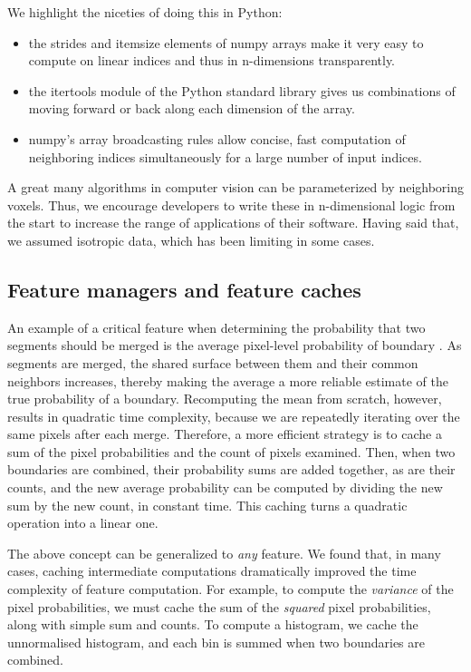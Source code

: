 \documentclass{frontiersSCNS} %
\begin{document}
We highlight the niceties of doing this in Python:
\begin{itemize}
\item the strides and itemsize elements of numpy arrays make it very easy to compute on linear indices and thus in n-dimensions transparently.
\item the itertools module of the Python standard library gives us combinations of moving forward or back along each dimension of the array.
\item numpy's array broadcasting rules allow concise, fast computation of neighboring indices simultaneously for a large number of input indices.
\end{itemize}

A great many algorithms in computer vision can be parameterized by neighboring voxels.
Thus, we encourage developers to write these in n-dimensional logic from the start to increase the range of applications of their software.
Having said that, we assumed isotropic data, which has been limiting in some cases.

\subsection{Feature managers and feature caches}
\label{sec:feature-man}

An example of a critical feature when determining the probability that two segments should be merged is the average pixel-level probability of boundary \citep{Ren:2003jg}.
As segments are merged, the shared surface between them and their common neighbors increases, thereby making the average a more reliable estimate of the true probability of a boundary.
Recomputing the mean from scratch, however, results in quadratic time complexity, because we are repeatedly iterating over the same pixels after each merge.
Therefore, a more efficient strategy is to cache a sum of the pixel probabilities and the count of pixels examined.
Then, when two boundaries are combined, their probability sums are added together, as are their counts, and the new average probability can be computed by dividing the new sum by the new count, in constant time.
This caching turns a quadratic operation into a linear one.

The above concept can be generalized to \emph{any} feature.
We found that, in many cases, caching intermediate computations dramatically improved the time complexity of feature computation.
For example, to compute the \emph{variance} of the pixel probabilities, we must cache the sum of the \emph{squared} pixel probabilities, along with simple sum and counts.
To compute a histogram, we cache the unnormalised histogram, and each bin is summed when two boundaries are combined.
\end{document}
